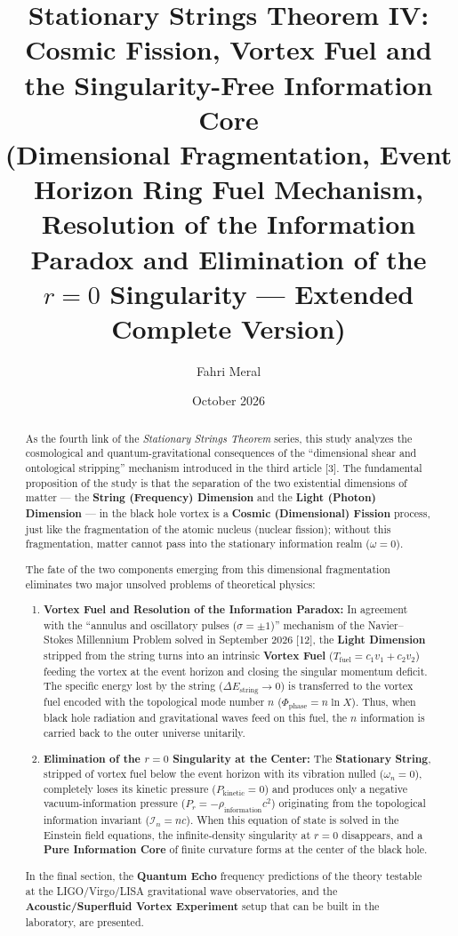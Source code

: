 \documentclass[12pt,a4paper]{article}
\title{\textbf{Stationary Strings Theorem IV: Cosmic Fission, Vortex Fuel and the Singularity-Free Information Core} \\[0.3cm]
\large (Dimensional Fragmentation, Event Horizon Ring Fuel Mechanism, Resolution of the Information Paradox and Elimination of the $r=0$ Singularity --- Extended Complete Version)}
\author{Fahri Meral}
\date{October 2026}
\begin{document}
\maketitle

\begin{abstract}
As the fourth link of the \textit{Stationary Strings Theorem} series, this study analyzes the cosmological and quantum-gravitational consequences of the ``dimensional shear and ontological stripping'' mechanism introduced in the third article [3]. The fundamental proposition of the study is that the separation of the two existential dimensions of matter --- the \textbf{String (Frequency) Dimension} and the \textbf{Light (Photon) Dimension} --- in the black hole vortex is a \textbf{Cosmic (Dimensional) Fission} process, just like the fragmentation of the atomic nucleus (nuclear fission); without this fragmentation, matter cannot pass into the stationary information realm ($\omega = 0$).

The fate of the two components emerging from this dimensional fragmentation eliminates two major unsolved problems of theoretical physics:
\begin{enumerate}
    \item \textbf{Vortex Fuel and Resolution of the Information Paradox:} In agreement with the ``annulus and oscillatory pulses ($\sigma = \pm 1$)'' mechanism of the Navier--Stokes Millennium Problem solved in September 2026 [12], the \textbf{Light Dimension} stripped from the string turns into an intrinsic \textbf{Vortex Fuel} ($T_{\text{fuel}} = c_1 v_1 + c_2 v_2$) feeding the vortex at the event horizon and closing the singular momentum deficit. The specific energy lost by the string ($\Delta E_{\text{string}} \to 0$) is transferred to the vortex fuel encoded with the topological mode number $n$ ($\Phi_{\text{phase}} = n \ln X$). Thus, when black hole radiation and gravitational waves feed on this fuel, the $n$ information is carried back to the outer universe unitarily.
    \item \textbf{Elimination of the $r=0$ Singularity at the Center:} The \textbf{Stationary String}, stripped of vortex fuel below the event horizon with its vibration nulled ($\omega_n = 0$), completely loses its kinetic pressure ($P_{\text{kinetic}} = 0$) and produces only a negative vacuum-information pressure ($P_r = -\rho_{\text{information}} c^2$) originating from the topological information invariant ($\mathcal{I}_n = n c$). When this equation of state is solved in the Einstein field equations, the infinite-density singularity at $r=0$ disappears, and a \textbf{Pure Information Core} of finite curvature forms at the center of the black hole.
\end{enumerate}
In the final section, the \textbf{Quantum Echo} frequency predictions of the theory testable at the LIGO/Virgo/LISA gravitational wave observatories, and the \textbf{Acoustic/Superfluid Vortex Experiment} setup that can be built in the laboratory, are presented.
\end{abstract}
\end{document}
